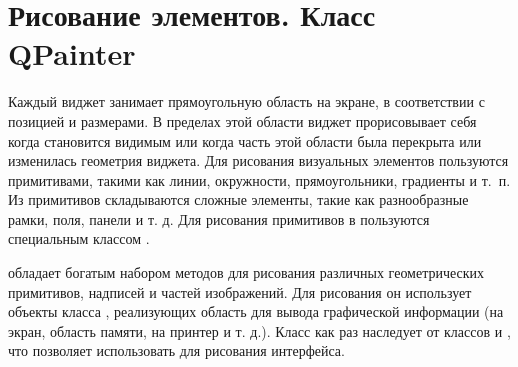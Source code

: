 \section[Рисование элементов. Класс QPainter]{Рисование элементов. Класс QPainter}
Каждый виджет занимает прямоугольную область на экране, в соответствии с позицией и размерами. В пределах этой области
виджет прорисовывает себя когда становится видимым или когда часть этой области была перекрыта или изменилась геометрия
виджета. Для рисования визуальных элементов пользуются примитивами, такими как линии, окружности, прямоугольники,
градиенты и т.~п. Из примитивов складываются сложные элементы, такие как разнообразные рамки, поля, панели и т. д. Для
рисования примитивов в  пользуются специальным классом .

 обладает богатым набором методов для рисования различных геометрических примитивов, надписей и
частей изображений. Для рисования он использует объекты класса ,
реализующих область для вывода графической информации (на экран, область памяти, на принтер и т. д.). Класс
 как раз наследует от классов  и 
, что позволяет использовать  для рисования интерфейса.


